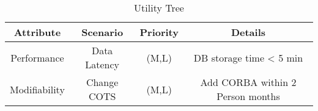 \begin{table}[H]
	\begin{center}
		\begin{tabular}{| c | c | c | c |}
    		\hline
			\textbf{Attribute}		&	\textbf{Scenario} 	&   \textbf{Priority} 	& \textbf{Details} 			\\															
			\hline
			Performance				& 	Data Latency		& 	(M,L)				& DB storage time < 5 min	\\
			Modifiability			&	Change COTS			& 	(M,L)				& Add CORBA within 2 Person months \\
			\hline
    	\end{tabular}
	\end{center}
	\label{tab:Utility_tree}
	\caption{Utility Tree}
\end{table}